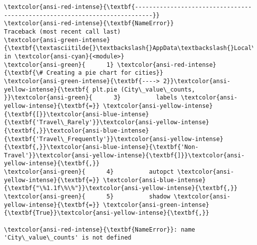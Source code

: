 \documentclass[11pt]{article}
\makeatletter
\newcommand{\boxspacing}{\kern\kvtcb@left@rule\kern\kvtcb@boxsep}
\newcommand{\prompt}[4]{
        {\ttfamily\llap{{\color{#2}[#3]:\hspace{3pt}#4}}\vspace{-\baselineskip}}
    }
\makeatother
\begin{document}
    \begin{Verbatim}[commandchars=\\\{\}, frame=single, framerule=2mm, rulecolor=\color{outerrorbackground}]
\textcolor{ansi-red-intense}{\textbf{---------------------------------------------------------------------------}}
\textcolor{ansi-red-intense}{\textbf{NameError}}                                 Traceback (most recent call last)
\textcolor{ansi-green-intense}{\textbf{\textasciitilde{}\textbackslash{}AppData\textbackslash{}Local\textbackslash{}Temp\textbackslash{}ipykernel\_7588\textbackslash{}4070294782.py}} in \textcolor{ansi-cyan}{<module>}
\textcolor{ansi-green}{      1} \textcolor{ansi-red-intense}{\textbf{\# Creating a pie chart for cities}}
\textcolor{ansi-green-intense}{\textbf{----> 2}}\textcolor{ansi-yellow-intense}{\textbf{ plt.pie (City\_value\_counts,
}}\textcolor{ansi-green}{      3}          labels \textcolor{ansi-yellow-intense}{\textbf{=}} \textcolor{ansi-yellow-intense}{\textbf{[}}\textcolor{ansi-blue-intense}{\textbf{'Travel\_Rarely'}}\textcolor{ansi-yellow-intense}{\textbf{,}}\textcolor{ansi-blue-intense}{\textbf{'Travel\_Frequently'}}\textcolor{ansi-yellow-intense}{\textbf{,}}\textcolor{ansi-blue-intense}{\textbf{'Non-Travel'}}\textcolor{ansi-yellow-intense}{\textbf{]}}\textcolor{ansi-yellow-intense}{\textbf{,}}
\textcolor{ansi-green}{      4}          autopct \textcolor{ansi-yellow-intense}{\textbf{=}} \textcolor{ansi-blue-intense}{\textbf{"\%1.1f\%\%"}}\textcolor{ansi-yellow-intense}{\textbf{,}}
\textcolor{ansi-green}{      5}          shadow \textcolor{ansi-yellow-intense}{\textbf{=}} \textcolor{ansi-green-intense}{\textbf{True}}\textcolor{ansi-yellow-intense}{\textbf{,}}

\textcolor{ansi-red-intense}{\textbf{NameError}}: name 'City\_value\_counts' is not defined
    \end{Verbatim}

    \begin{tcolorbox}[breakable, size=fbox, boxrule=1pt, pad at break*=1mm,colback=cellbackground, colframe=cellborder]
\prompt{In}{incolor}{ }{\boxspacing}
\begin{Verbatim}[commandchars=\\\{\}]

\end{Verbatim}
\end{tcolorbox}

    \begin{tcolorbox}[breakable, size=fbox, boxrule=1pt, pad at break*=1mm,colback=cellbackground, colframe=cellborder]
\prompt{In}{incolor}{ }{\boxspacing}
\begin{Verbatim}[commandchars=\\\{\}]

\end{Verbatim}
\end{tcolorbox}
\end{document}

